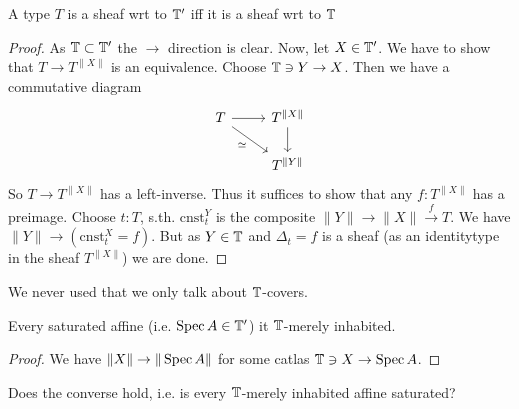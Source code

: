 \begin{lemma}
	A type $T$ is a sheaf wrt to $\mathbb{T}'$ iff it is a sheaf wrt to $\mathbb{T}$
\end{lemma}
\begin{proof}
	As $\mathbb{T} \subset \mathbb{T}'$ the $\rightarrow$ direction is clear. Now, let $X \in \mathbb{T}'$. We have to show that $T \to T^{\|X\|}$ is an equivalence. Choose $\mathbb{T} \ni Y \to X$. Then we have a commutative diagram
	\[\begin{tikzcd}
		T & {T^{\|X\|}} \\
		& {T^{\|Y\|}}
		\arrow[from=1-1, to=1-2]
		\arrow["\simeq"', from=1-1, to=2-2]
		\arrow[from=1-2, to=2-2]
	\end{tikzcd}\]
	So $T \to T^{\|X\|}$ has a left-inverse. Thus it suffices to show that any $f : T^{\|X\|}$ has a preimage. Choose $t : T$, s.th. $\mathrm{cnst}^Y_t$ is the composite $\|Y\| \to \|X\| \overset{f}{\to} T$. We have $\|Y\| \to (\mathrm{cnst}^X_t = f)$. But as $Y \in \mathbb{T}$ and $\Delta_t = f$ is a sheaf (as an identitytype in the sheaf $T^{\|X\|}$) we are done.
\end{proof}
\begin{rmk}
	We never used that we only talk about $\mathbb{T}$-covers.
\end{rmk}
\begin{lemma}
	Every saturated affine (i.e. $\operatorname{Spec} A \in \mathbb{T}'$) it $\mathbb{T}$-merely inhabited.     
\end{lemma}
\begin{proof}
	We have $\|X\| \to \|\operatorname{Spec} A\|$ for some catlas $\mathbb{T} \ni X \to \operatorname{Spec} A$.
\end{proof}

\begin{question}
	Does the converse hold, i.e. is every $\mathbb{T}$-merely inhabited affine saturated?    
\end{question}


